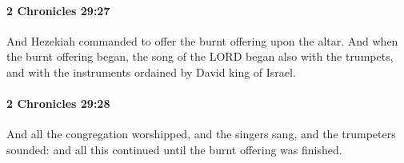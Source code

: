 		\paragraph{2 Chronicles 29:27} %
			\label{2CHRONICLES-29-27}

			And Hezekiah commanded to offer the burnt offering upon the altar. And when the burnt offering began, the song of the LORD began also with the trumpets, and with the instruments ordained by David king of Israel.


		\paragraph{2 Chronicles 29:28} %
			\label{2CHRONICLES-29-28}

			And all the congregation worshipped, and the singers sang, and the trumpeters sounded: and all this continued until the burnt offering was finished.

